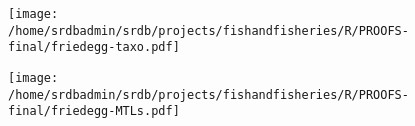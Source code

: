\documentclass[letterpaper,12pt]{article}
\begin{document}
\begin{figure}
\begin{center}
\texttt{[image: /home/srdbadmin/srdb/projects/fishandfisheries/R/PROOFS-final/friedegg-taxo.pdf]}
\end{center}
\caption{ }
\label{fig:taxo}
\end{figure}


\begin{landscape}
\begin{figure}
\begin{center}
\texttt{[image: /home/srdbadmin/srdb/projects/fishandfisheries/R/PROOFS-final/friedegg-MTLs.pdf]}
\end{center}
\caption{ }
\label{fig:mtl}
\end{figure}
\end{landscape}
\end{document}
